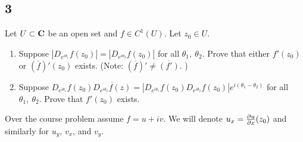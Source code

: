 \documentclass[12pt]{article}
\begin{document}
\subsection*{3}
\begin{tcolorbox}
Let $U\subset {\bf C}$ be an open set  and  $f\in C^1(U)$. Let $z_0\in U$.
\begin{enumerate}[label=(\alph*),itemsep=1ex]
\item Suppose $|D_{e^{i\theta_1}}f(z_0)|=|D_{e^{i\theta_2}}f(z_0)|$  for all $\theta_1,\ \theta_2$.  Prove that either $f'(z_0)$ or $(\overline{f})'(z_0)$ exists. (Note: $(\overline{f})'\neq    \overline{(f')}$. )
\item Suppose $D_{e^{i\theta_1}}f(z_0) \overline{  D_{e^{i\theta_2}}f(z)}=|D_{e^{i\theta_1}}f(z_0)   D_{e^{i\theta_2}}f(z_0)|e^{i(\theta_1-\theta_2)}$ for all $\theta_1,\ \theta_2$. Prove that   $f'(z_0)$ exists.
\end{enumerate}
\end{tcolorbox}
Over the course problem assume $f = u + iv$. We will denote $u_x = \frac{\partial u}{\partial x}(z_{0})$ and similarly for $u_y$, $v_x$, and $v_y$. 
\end{document}
